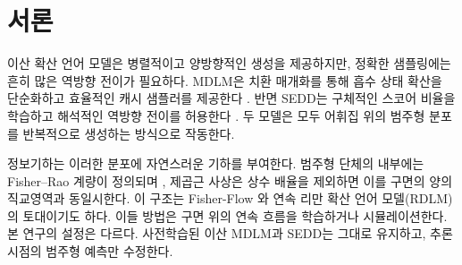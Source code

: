 \begin{abstract}
마스킹 이산 확산 언어 모델은 범주형 잡음 제거 전이를 연속적으로 수행하여 텍스트를 생성한다.
본 연구는 토큰별 범주형 예측을 Fisher--Rao 통계 다양체 위의 점으로 취급하는 추론 시점 수정법을
다룬다. 제곱근 사상은 범주형 단체를 초구의 양의 직교영역에 매장하며, 이 공간에서는 닫힌형식의
구면 보간을 사용할 수 있다. 각 역방향 단계에서 이전 외삽 예측에서 현재 모델 예측을 통과하는
대원의 호를 재귀적으로 연장하고, 그 결과를 다시 범주형 분포로 변환한 뒤 원래 MDLM 또는 SEDD
전이에 삽입한다. 이 방법을 \textbf{측지 모멘텀 샘플링}이라 부른다.

정확한 기하학적 유도를 제시하고, 사영 이전 갱신이 지수사상에 의한 연장과 동치임을 증명하며,
작은 각도에서의 계수가 가변 스텝 2단계 Adams--Bashforth 외삽 계수와 일치함을 보인다. 동시에
이 유사성의 한계를 분명히 한다. 본 방법은 접벡터장이 아니라 예측 분포를 외삽하고, 확률적 범주형
점프를 유지하며, 양의 직교영역으로의 사영을 사용한다. 따라서 이 방법은 2차 정확도의 확률흐름
ODE 솔버가 아니며, 2차 수렴성을 주장하지 않는다. OpenWebText 체크포인트로 수행되어 보존된
실험 결과는 MDLM의 10--100 역방향 스텝과 SEDD의 10--50 스텝에서 GPT-2 생성 퍼플렉서티가
개선될 가능성을 보여준다.
\end{abstract}

\section{서론}

이산 확산 언어 모델은 병렬적이고 양방향적인 생성을 제공하지만, 정확한 샘플링에는 흔히 많은
역방향 전이가 필요하다. MDLM은 치환 매개화를 통해 흡수 상태 확산을 단순화하고 효율적인 캐시
샘플러를 제공한다 \citep{sahoo2024mdlm}. 반면 SEDD는 구체적인 스코어 비율을 학습하고 해석적인
역방향 전이를 허용한다 \citep{lou2024sedd}. 두 모델은 모두 어휘집 위의 범주형 분포를 반복적으로
생성하는 방식으로 작동한다.

정보기하는 이러한 분포에 자연스러운 기하를 부여한다. 범주형 단체의 내부에는 Fisher--Rao 계량이
정의되며 \citep{amari2016information}, 제곱근 사상은 상수 배율을 제외하면 이를 구면의 양의
직교영역과 동일시한다. 이 구조는 Fisher-Flow \citep{davis2024fisherflow}와 연속 리만 확산 언어
모델(RDLM) \citep{jo2025rdlm}의 토대이기도 하다. 이들 방법은 구면 위의 연속 흐름을 학습하거나
시뮬레이션한다. 본 연구의 설정은 다르다. 사전학습된 이산 MDLM과 SEDD는 그대로 유지하고,
추론 시점의 범주형 예측만 수정한다.

